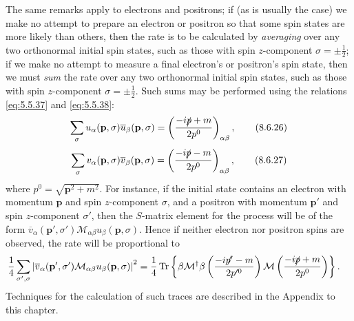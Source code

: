 The same remarks apply to electrons and positrons; if (as is usually the case)
we make no attempt to prepare an electron or positron so that some spin states
are more likely than others, then the rate is to be calculated by
\emph{averaging} over any two orthonormal initial spin states, such as those
with spin $z$-component $\sigma=\mathord\pm\frac12$; if we make no attempt to
measure a final electron's or positron's spin state, then we must \emph{sum}
the rate over any two orthonormal initial spin states, such as those with spin
$z$-component $\sigma=\mathord\pm\frac12$. Such sums may be performed using
the relations \eqref{eq:5.5.37} and \eqref{eq:5.5.38}:
\begin{equation}
\sum_\sigma u_\alpha(\mathbf p,\sigma)\overline u_\beta(\mathbf p,\sigma)
=\left(\frac{-i\sl{p}+m}{2p^0}\right)_{\alpha\beta},
\tag{8.6.26}\label{eq:8.6.26}
\end{equation}
\begin{equation}
\sum_\sigma v_\alpha(\mathbf p,\sigma)\overline v_\beta(\mathbf p,\sigma)
=\left(\frac{-i\sl{p}-m}{2p^0}\right)_{\alpha\beta},
\tag{8.6.27}\label{eq:8.6.27}
\end{equation}
where $p^0=\sqrt{\mathbf p^2+m^2}$. For instance, if the initial state
contains an electron with momentum $\mathbf p$ and spin $z$-component
$\sigma$, and a positron with momentum $\mathbf p'$ and spin $z$-component
$\sigma'$, then the $S$-matrix element for the process will be of the form
$\overline v_\alpha(\mathbf p',\sigma')\mathcal M_{\alpha\beta}
u_\beta(\mathbf p,\sigma)$. Hence if neither electron nor positron spins are
observed, the rate will be proportional to
\begin{align*}
&\frac14\sum_{\sigma',\sigma}
\left\lvert\overline v_\alpha(\mathbf p',\sigma')
\mathcal M_{\alpha\beta}u_\beta(\mathbf p,\sigma)\right\rvert^2
=
\frac14\operatorname{Tr}\left\{
\beta\mathcal M^\dagger\beta
\left(\frac{-i\sl{p'}-m}{2p'^0}\right)
\mathcal M
\left(\frac{-i\sl{p}+m}{2p^0}\right)
\right\}.
\end{align*}
Techniques for the calculation of such traces are described in the Appendix to
this chapter.
